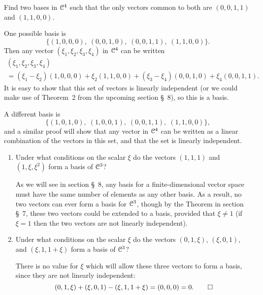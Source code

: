 Find two bases in $\mathcal{C}^4$ such that the only vectors common
to both are $(0,0,1,1)$ and $(1,1,0,0)$.
\begin{solution}
  One possible basis is
  \begin{equation*}
    \{ (1,0,0,0), \; (0,0,1,0), \; (0,0,1,1), \; (1,1,0,0) \}.
  \end{equation*}
  Then any vector $(\xi_1,\xi_2,\xi_3,\xi_4)$ in $\mathcal{C}^4$ can be written
  \begin{multline*}
    (\xi_1,\xi_2,\xi_3,\xi_4) \\
    = (\xi_1 - \xi_2)(1,0,0,0) + \xi_2(1,1,0,0)
    + (\xi_3 - \xi_4)(0,0,1,0) + \xi_4(0,0,1,1).
  \end{multline*}
  It is easy to show that this set of vectors is linearly independent
  (or we could make use of Theorem~2 from the upcoming section \S\ 8),
  so this is a basis.

  A different basis is
  \begin{equation*}
    \{ (1,0,1,0), \; (1,0,0,1), \; (0,0,1,1), \; (1,1,0,0) \},
  \end{equation*}
  and a similar proof will show that any vector in $\mathcal{C}^4$ can be
  written as a linear combination of the vectors in this set, and that
  the set is linearly independent.
\end{solution}

\begin{enumerate}
\item Under what conditions on the scalar $\xi$ do the vectors
  $(1,1,1)$ and $(1,\xi,\xi^2)$ form a basis of $\mathcal{C}^3$?
  \begin{solution}
    As we will see in section \S\ 8, any basis for a
    finite-dimensional vector space must have the same number of
    elements as any other basis. As a result, no two vectors can ever
    form a basis for $\mathcal{C}^3$, though by the Theorem in section \S\ 7,
    these two vectors could be extended to a basis, provided that
    $\xi\neq1$ (if $\xi = 1$ then the two vectors are not linearly
    independent).
  \end{solution}
\item Under what conditions on the scalar $\xi$ do the vectors
  $(0,1,\xi)$, $(\xi,0,1)$, and $(\xi,1,1+\xi)$ form a basis of
  $\mathcal{C}^3$?
  \begin{solution}
    There is no value for $\xi$ which will allow these three vectors
    to form a basis, since they are not linearly independent:
    \begin{equation*}
      (0,1,\xi) + (\xi,0,1) - (\xi,1,1+\xi) = (0,0,0) = 0. \qedhere
    \end{equation*}
  \end{solution}
\end{enumerate}

